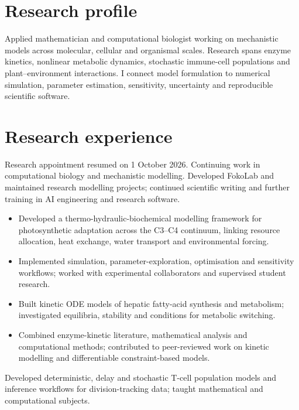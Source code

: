 
\section{Research profile}
Applied mathematician and computational biologist working on mechanistic models across molecular, cellular and organismal scales. Research spans enzyme kinetics, nonlinear metabolic dynamics, stochastic immune-cell populations and plant–environment interactions. I connect model formulation to numerical simulation, parameter estimation, sensitivity, uncertainty and reproducible scientific software.
\section{Research experience}
Research appointment resumed on 1 October 2026. Continuing work in computational biology and mechanistic modelling.
Developed FokoLab and maintained research modelling projects; continued scientific writing and further training in AI engineering and research software.
\begin{itemize}
\item Developed a thermo-hydraulic-biochemical modelling framework for photosynthetic adaptation across the C3–C4 continuum, linking resource allocation, heat exchange, water transport and environmental forcing.
\item Implemented simulation, parameter-exploration, optimisation and sensitivity workflows; worked with experimental collaborators and supervised student research.
\end{itemize}
\begin{itemize}
\item Built kinetic ODE models of hepatic fatty-acid synthesis and metabolism; investigated equilibria, stability and conditions for metabolic switching.
\item Combined enzyme-kinetic literature, mathematical analysis and computational methods; contributed to peer-reviewed work on kinetic modelling and differentiable constraint-based models.
\end{itemize}
Developed deterministic, delay and stochastic T-cell population models and inference workflows for division-tracking data; taught mathematical and computational subjects.
\newpage{}
